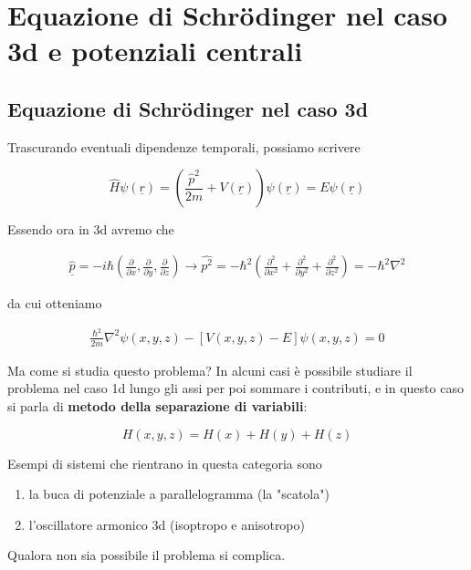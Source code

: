 \chapter{Equazione di Schrödinger nel caso 3d e potenziali centrali}

\section{Equazione di Schrödinger nel caso 3d}

Trascurando eventuali dipendenze temporali, possiamo scrivere

\begin{equation}
\hat H \psi(\underline r)= \left(
\frac{\hat p^2}{2m} + V(\underline r)
\right)\psi(\underline r)= E\psi(\underline r)
\end{equation}

Essendo ora in 3d avremo che

\begin{align}
\hat{\underline p} = -i\hbar \left(
\frac{\partial}{\partial x}, \frac{\partial}{\partial y}, \frac{\partial}{\partial z}
\right) \rightarrow 
\hat{p^2} = -\hbar^2 \left(
\frac{\partial^2}{\partial x ^2} + \frac{\partial^2}{\partial y^2} + \frac{\partial^2}{\partial z^2}
\right) = - \hbar^2 \nabla^2
\end{align}

da cui otteniamo

\begin{align}
 \frac{\hbar^2}{2m} \nabla^2\psi(x,y,z) - [V(x,y,z) - E]\psi(x,y,z)=0
\end{align}

Ma come si studia questo problema? In alcuni casi è possibile studiare il problema nel caso 1d lungo gli assi per poi sommare i contributi, e in questo caso si parla di \textbf{metodo della separazione di variabili}:

\begin{equation}
H(x,y,z)= H(x) + H(y) + H(z)
\end{equation}


Esempi di sistemi che rientrano in questa categoria sono
\begin{enumerate}
	\item la buca di potenziale a parallelogramma (la "scatola")
	\item l'oscillatore armonico 3d (isoptropo e anisotropo)
\end{enumerate}

Qualora non sia possibile il problema si complica.


